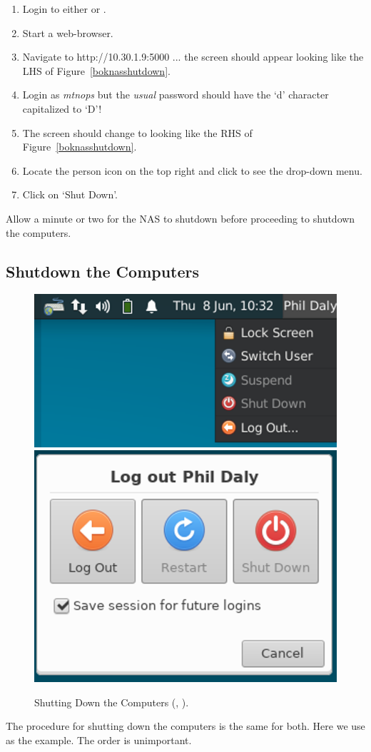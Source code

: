 \documentclass[12pt,twoside]{article}
\begin{document}
\begin{enumerate}
\item Login to either  or .
\item Start a web-browser.
\item Navigate to http://10.30.1.9:5000 ... the screen should appear looking like the LHS of Figure~\ref{boknasshutdown}.
\item Login as \emph{mtnops} but the \emph{usual} password should have the `d' character capitalized to `D'!
\item The screen should change to looking like the RHS of Figure~\ref{boknasshutdown}.
\item Locate the person icon on the top right and click to see the drop-down menu.
\item Click on `Shut Down'.
\end{enumerate}

Allow a minute or two for the NAS to shutdown before proceeding to shutdown the computers.

\subsection{Shutdown the Computers}
\begin{figure}[!h]
 \centering
 \includegraphics[width=0.45\linewidth]{bonsai1.png}
 \includegraphics[width=0.45\linewidth]{bonsai2.png}
 \caption{Shutting Down the Computers (, ).}
 \label{computershutdown}
\end{figure}

The procedure for shutting down the computers is the same for both. Here we use  as the example.
The order is unimportant.
\end{document}
